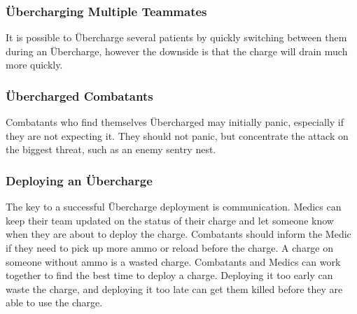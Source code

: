 \subsubsection{Übercharging Multiple Teammates}
It is possible to Übercharge several patients by quickly switching between them during an Übercharge, however the downside is that the charge will drain much more quickly.

\subsubsection{Übercharged Combatants}
Combatants who find themselves Übercharged may initially panic, especially if they are not expecting it.  They should not panic, but concentrate the attack on the biggest threat, such as an enemy sentry nest.

\subsubsection{Deploying an Übercharge}
The key to a successful Übercharge deployment is communication.  Medics can keep their team updated on the status of their charge and let someone know when they are about to deploy the charge.  Combatants should inform the Medic if they need to pick up more ammo or reload before the charge.  A charge on someone without ammo is a wasted charge.  Combatants and Medics can work together to find the best time to deploy a charge.  Deploying it too early can waste the charge, and deploying it too late can get them killed before they are able to use the charge. 